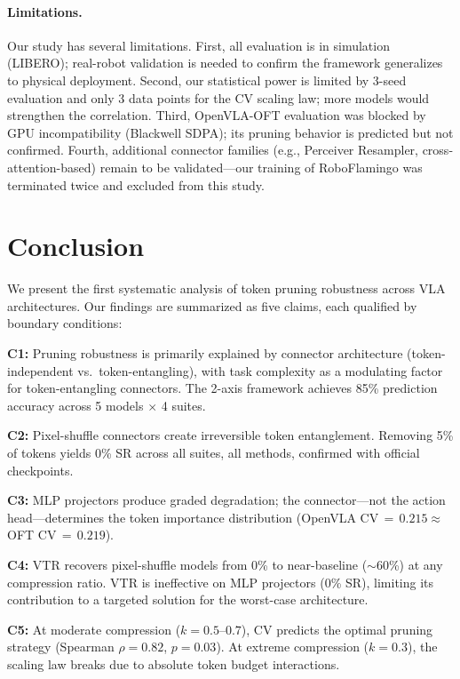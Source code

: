 \documentclass[10pt,twocolumn]{article}
\begin{document}
\paragraph{Limitations.}
Our study has several limitations.
First, all evaluation is in simulation (LIBERO); real-robot validation is needed to confirm the framework generalizes to physical deployment.
Second, our statistical power is limited by 3-seed evaluation and only 3 data points for the CV scaling law; more models would strengthen the correlation.
Third, OpenVLA-OFT evaluation was blocked by GPU incompatibility (Blackwell SDPA); its pruning behavior is predicted but not confirmed.
Fourth, additional connector families (e.g., Perceiver Resampler, cross-attention-based) remain to be validated---our training of RoboFlamingo was terminated twice and excluded from this study.

\section{Conclusion}

We present the first systematic analysis of token pruning robustness across VLA architectures.
Our findings are summarized as five claims, each qualified by boundary conditions:

\textbf{C1:} Pruning robustness is primarily explained by connector architecture (token-independent vs.\ token-entangling), with task complexity as a modulating factor for token-entangling connectors.
The 2-axis framework achieves 85\% prediction accuracy across 5 models $\times$ 4 suites.

\textbf{C2:} Pixel-shuffle connectors create irreversible token entanglement.
Removing 5\% of tokens yields 0\% SR across all suites, all methods, confirmed with official checkpoints.

\textbf{C3:} MLP projectors produce graded degradation; the connector---not the action head---determines the token importance distribution (OpenVLA CV$\,=\,0.215 \approx$ OFT CV$\,=\,0.219$).

\textbf{C4:} VTR recovers pixel-shuffle models from 0\% to near-baseline (${\sim}$60\%) at any compression ratio.
VTR is ineffective on MLP projectors (0\% SR), limiting its contribution to a targeted solution for the worst-case architecture.

\textbf{C5:} At moderate compression ($k\!=\!0.5$--$0.7$), CV predicts the optimal pruning strategy (Spearman $\rho=0.82$, $p=0.03$).
At extreme compression ($k\!=\!0.3$), the scaling law breaks due to absolute token budget interactions.
\end{document}
